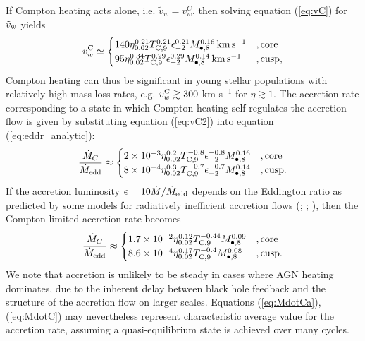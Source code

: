 \documentclass[usenatbib,fleqn]{mn2e}
\begin{document}
If Compton heating acts alone, i.e. $\tilde{v}_{w} = v_{w}^{C}$, then
solving equation (\ref{eq:vC}) for $\tilde{v}_{\rm w}$ yields
\begin{align} v_{w}^{\rm C} \simeq
  \begin{cases} 140 \eta_{0.02}^{0.21}T_{\rm
C,9}^{0.21}\epsilon_{-2}^{0.21} M_{\bullet,8}^{0.16}\,{\rm km\,s^{-1}}
&, \text{core}\\ 95 \eta_{0.02}^{0.34}T_{\rm
C,9}^{0.29}\epsilon_{-2}^{0.29} M_{\bullet,8}^{0.14}\,{\rm km\,s^{-1}}
&, \text{cusp},
  \end{cases}
  \label{eq:vC2}
\end{align} 
Compton heating can thus be significant in young stellar populations
with relatively high mass loss rates, e.g. $v_{w}^{\rm C} \gtrsim 300$
km s$^{-1}$ for $\eta \gtrsim 1$.  The accretion rate
corresponding to a state in which Compton heating self-regulates the accretion flow is given by substituting equation (\ref{eq:vC2}) into equation (\ref{eq:eddr_analytic}):
\begin{align}
\frac{\dot{M}_{C}}{\dot{M}_{\rm edd}} \approx 
\begin{cases} 2\times 10^{-3} \eta_{0.02}^{0.2}T_{\rm
C,9}^{-0.8}\epsilon_{-2}^{-0.8} M_{\bullet,8}^{0.16}
&, \text{core}\\ 8\times 10^{-4} \eta_{0.02}^{0.3}T_{\rm
C,9}^{-0.7}\epsilon_{-2}^{-0.7} M_{\bullet,8}^{0.14}
&, \text{cusp}.
  \end{cases}
  \label{eq:MdotCa}
\end{align}
If the accretion luminosity $\epsilon = 10 \dot{M}/\dot{M}_{\rm edd}$ depends on the Eddington ratio as predicted by some models for
radiatively inefficient accretion flows (\citealt{Narayan&Yi95};
\citealt{Narayan+98}; \citealt{XieYuan:2012a}), then the Compton-limited accretion rate becomes
\begin{align}
\frac{\dot{M}_{C}}{\dot{M}_{\rm edd}} \approx 
\begin{cases} 1.7\times 10^{-2} \eta_{0.02}^{0.12}T_{\rm
C,9}^{-0.44}M_{\bullet,8}^{0.09}
&, \text{core}\\ 8.6\times 10^{-4} \eta_{0.02}^{0.17}T_{\rm
C,9}^{-0.4} M_{\bullet,8}^{0.08}
&, \text{cusp}.
  \end{cases}
  \label{eq:MdotC}
\end{align}
We note that accretion is unlikely to be steady in cases where AGN heating dominates, due to the inherent delay between black hole feedback and the structure of the accretion flow on larger scales.   Equations (\ref{eq:MdotCa}), (\ref{eq:MdotC}) may nevertheless represent characteristic average value for the accretion rate, assuming a quasi-equilibrium state is achieved over many cycles.  
\end{document}
